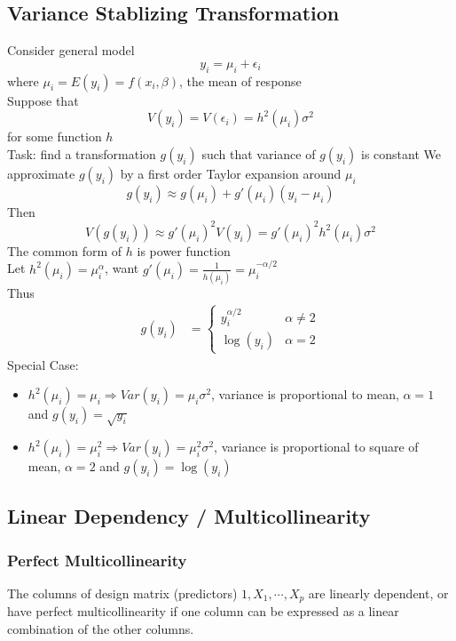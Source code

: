 \documentclass[11pt]{article}
\begin{document}
\subsection{Variance Stablizing Transformation}
Consider general model 
\[y_i=\mu_i+\epsilon_i\]
where $\mu_i=E(y_i)=f(x_i, \beta)$, the mean of response \\
Suppose that 
\[V(y_i) = V(\epsilon_i) = h^2(\mu_i)\sigma^2\] 
for some function $h$\\
Task: find a transformation $g(y_i)$ such that variance of $g(y_i)$ is constant
We approximate $g(y_i)$ by a first order Taylor expansion around $\mu_i$
\[g(y_i) \approx g(\mu_i) + g'(\mu_i)(y_i-\mu_i)\]
Then
\[V(g(y_i)) \approx g'(\mu_i)^2V(y_i) = g'(\mu_i)^2h^2(\mu_i)\sigma^2\]
The common form of $h$ is power function \\
Let $h^2(\mu_i) = \mu_i^{\alpha}$, want $g'(\mu_i) = \frac{1}{h(\mu_i)} = \mu_i^{-\alpha/2}$ \\
Thus 
\begin{align*}
    g(y_i) &= 
    \begin{cases}
        y_i^{\alpha/2} &\alpha\neq 2 \\
        \log(y_i) &\alpha=2
    \end{cases}
\end{align*}
Special Case: 
\begin{itemize}
    \item $h^2(\mu_i)=\mu_i\Rightarrow Var(y_i)=\mu_i\sigma^2$, variance is proportional to mean, $\alpha=1$ and $g(y_i)=\sqrt{y_i}$
    \item $h^2(\mu_i)=\mu_i^2\Rightarrow Var(y_i)=\mu_i^2\sigma^2$, variance is proportional to square of mean, $\alpha=2$ and $g(y_i)=\log(y_i)$
\end{itemize}
\subsection{Linear Dependency / Multicollinearity}
\subsubsection{Perfect Multicollinearity}
The columns of design matrix (predictors) $1,X_1,\cdots,X_p$ are linearly dependent, or have perfect multicollinearity
if one column can be expressed as a linear combination of the other columns.
\end{document}
